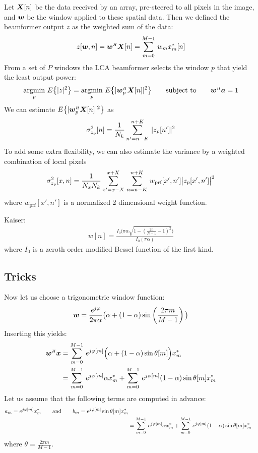 Let $\boldsymbol{X}[n]$ be the data received by an array, pre-steered to all pixels in the image, and $\boldsymbol{w}$ be the window applied to these spatial data. Then we defined the beamformer output $z$ as the weighted sum of the data:
%
\begin{align}
z[\boldsymbol{w},n] = \boldsymbol{w}^{\scriptscriptstyle H}\boldsymbol{X}[n] = \sum\limits_{m=0}^{M-1}\, w_m x_m^*[n]
\end{align}
%
From a set of $P$ windows the LCA beamformer selects the window $p$ that yield the least output power:
%
\begin{align}
\underset{p}{\text{argmin}}\ {E\big\{|z|^2\big\}} = \underset{p}{\text{argmin}}\ {E\big\{|\boldsymbol{w}_p^{\scriptscriptstyle H}\boldsymbol{X}[n]|^2\big\}} \qquad\text{subject to}\qquad \boldsymbol{w}^{\scriptscriptstyle H}\boldsymbol{a} = 1
\end{align}
%
We can estimate $E\big\{|\boldsymbol{w}_p^{\scriptscriptstyle H}\boldsymbol{X}[n]|^2\big\}$ as
%
\begin{align*}
\sigma^2_{z_p}[n] = \frac{1}{N_k} \sum\limits_{n'=n-K}^{n+K}\, | z_p[n'] |^2
\end{align*}
%
To add some extra flexibility, we can also estimate the variance by a weighted combination of local pixels
%
\begin{align*}
\sigma^2_{z_p}[x,n] = \frac{1}{N_x N_k} \sum\limits_{x'=x-X}^{x+X}\, \sum\limits_{n=n-K}^{n+K}\, w_\text{prf}[x',n']\big| z_p[x',n'] \big|^2
\end{align*}
%
where $w_\text{prf}[x',n']$ is a normalized 2 dimensional weight function. 

Kaiser:
%
\begin{align*}
w[n] = \frac{I_0\big( \pi\alpha\sqrt{1-(\frac{2n}{N-1}-1)^2}\big)}{I_0(\pi\alpha)}
\end{align*}
%
where $I_0$ is a zeroth order modified Bessel function of the first kind.


\subsection{Tricks}

Now let us choose a trigonometric window function:
%
\begin{align}
\boldsymbol{w} = \frac{e^{j\varphi}}{2\pi\alpha}\big(\alpha + (1-\alpha)\sin\left(\frac{2\pi m}{M-1}\right)\big)
\end{align}
%
Inserting this yields:
%
\begin{align}
\boldsymbol{w}^{\scriptscriptstyle H}\boldsymbol{x} &= \sum\limits_{m=0}^{M-1}\, e^{j\varphi[m]}\Big(\alpha + (1-\alpha)\sin\theta[m]\Big) x_m^* \nonumber\\
&= \sum\limits_{m=0}^{M-1}\, e^{j\varphi[m]}\alpha x_m^* + \sum\limits_{m=0}^{M-1}\, e^{j\varphi[m]}(1-\alpha)\sin\theta[m] x_m^*
\end{align}
%
Let us assume that the following terms are computed in advance:
%
\begin{align}
a_m = e^{j\varphi[m]}x_m^* \qquad \text{and} \qquad b_m = e^{j\varphi[m]}\sin\theta[m] x_m^* \nonumber\\
&= \sum\limits_{m=0}^{M-1}\, e^{j\varphi[m]}\alpha x_m^* + \sum\limits_{m=0}^{M-1}\, e^{j\varphi[m]}(1-\alpha)\sin\theta[m] x_m^*
\end{align}
%
where $\theta = \frac{2\pi m}{M-1}$. 


